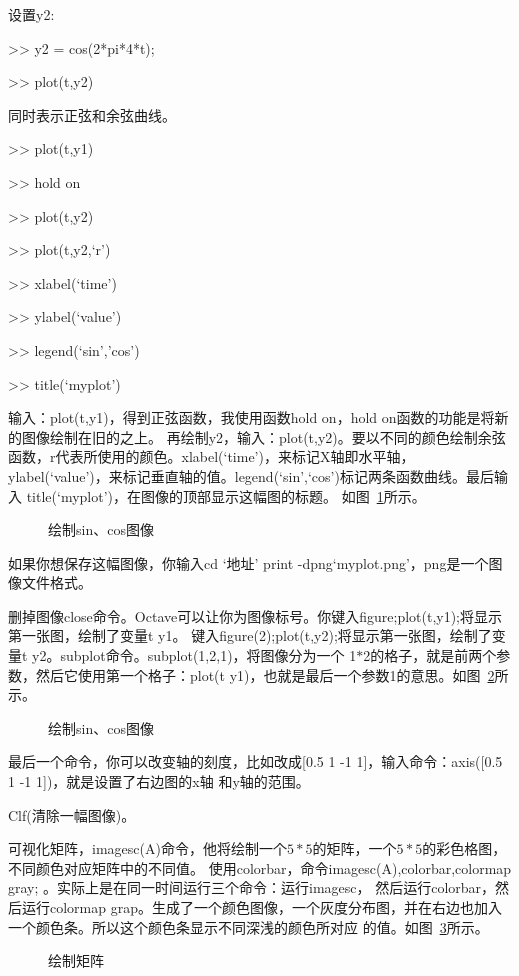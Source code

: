 \documentclass[UTF8]{ctexart}
\begin{document}
设置y2:

>> y2 = cos(2*pi*4*t);

>> plot(t,y2)

同时表示正弦和余弦曲线。

>> plot(t,y1)

>> hold on

>> plot(t,y2)

>> plot(t,y2,`r')

>> xlabel(`time')

>> ylabel(`value')

>> legend(`sin','cos')

>> title(`myplot')

输入：plot(t,y1)，得到正弦函数，我使用函数hold on，hold on函数的功能是将新的图像绘制在旧的之上。
再绘制y2，输入：plot(t,y2)。要以不同的颜色绘制余弦函数，r代表所使用的颜色。xlabel(`time')，来标记X轴即水平轴，
ylabel(`value')，来标记垂直轴的值。legend(`sin',`cos')标记两条函数曲线。最后输入 title(`myplot')，在图像的顶部显示这幅图的标题。
如图~\ref{fig:28}所示。
\begin{figure}[H]
 \caption{绘制sin、cos图像}
 \label{fig:28}
\end{figure}

如果你想保存这幅图像，你输入cd `地址' print -dpng`myplot.png'，png是一个图像文件格式。

删掉图像close命令。Octave可以让你为图像标号。你键入figure;plot(t,y1);将显示第一张图，绘制了变量t y1。
键入figure(2);plot(t,y2);将显示第一张图，绘制了变量t y2。subplot命令。subplot(1,2,1)，将图像分为一个
1$*$2的格子，就是前两个参数，然后它使用第一个格子：plot(t y1)，也就是最后一个参数1的意思。如图~\ref{fig:29}所示。
\begin{figure}[H]
 \caption{绘制sin、cos图像}
 \label{fig:29}
\end{figure}

最后一个命令，你可以改变轴的刻度，比如改成[0.5 1 -1 1]，输入命令：axis([0.5 1 -1 1])，就是设置了右边图的x轴
和y轴的范围。

Clf(清除一幅图像)。

可视化矩阵，imagesc(A)命令，他将绘制一个$5*5$的矩阵，一个$5*5$的彩色格图，不同颜色对应矩阵中的不同值。
使用colorbar，命令imagesc(A),colorbar,colormap gray; 。实际上是在同一时间运行三个命令：运行imagesc，
然后运行colorbar，然后运行colormap grap。生成了一个颜色图像，一个灰度分布图，并在右边也加入一个颜色条。所以这个颜色条显示不同深浅的颜色所对应
的值。如图~\ref{fig:30}所示。
\begin{figure}[H]
 \caption{绘制矩阵}
 \label{fig:30}
\end{figure}
\end{document}

